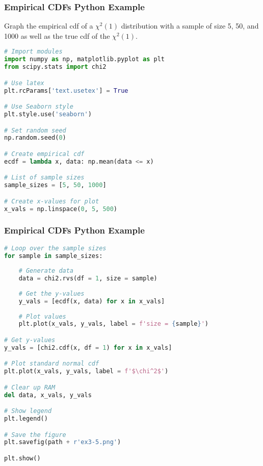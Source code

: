 \documentclass{beamer}
\begin{document}
\begin{frame}[fragile]
\frametitle{Empirical CDFs Python Example}
\small
\begin{Example}
Graph the empirical cdf of a $\chi^2(1)$ distribution with a sample of size 5, 50, and 1000 as well as the true cdf of the $\chi^2(1)$.
\end{Example}

\begin{lstlisting}[language=Python]
# Import modules
import numpy as np, matplotlib.pyplot as plt
from scipy.stats import chi2

# Use latex
plt.rcParams['text.usetex'] = True

# Use Seaborn style
plt.style.use('seaborn')

# Set random seed
np.random.seed(0)

# Create empirical cdf
ecdf = lambda x, data: np.mean(data <= x)

# List of sample sizes
sample_sizes = [5, 50, 1000]

# Create x-values for plot
x_vals = np.linspace(0, 5, 500)
\end{lstlisting}

\end{frame}

\begin{frame}[fragile]
\frametitle{Empirical CDFs Python Example}

\begin{lstlisting}[language=Python]
# Loop over the sample sizes
for sample in sample_sizes:
    
    # Generate data
    data = chi2.rvs(df = 1, size = sample)
    
    # Get the y-values
    y_vals = [ecdf(x, data) for x in x_vals]
    
    # Plot values
    plt.plot(x_vals, y_vals, label = f'size = {sample}')

# Get y-values
y_vals = [chi2.cdf(x, df = 1) for x in x_vals]

# Plot standard normal cdf
plt.plot(x_vals, y_vals, label = f'$\chi^2$')

# Clear up RAM
del data, x_vals, y_vals

# Show legend
plt.legend()

# Save the figure
plt.savefig(path + r'ex3-5.png')

plt.show()
\end{lstlisting}

\end{frame}
\end{document}
